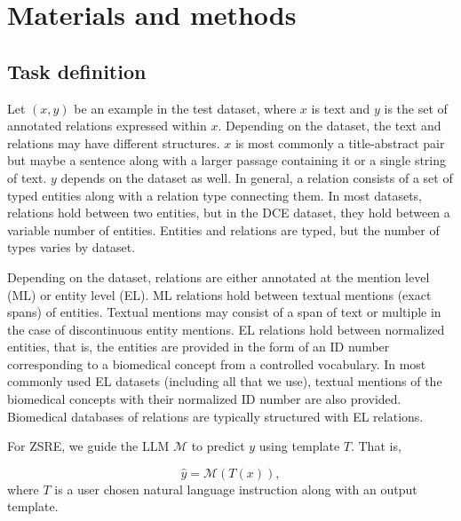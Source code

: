 \documentclass[11pt]{article}
\begin{document}
\section{Materials and methods}
\vspace{-1mm}
\subsection{Task definition}
Let $\left(x,y\right)$ be an example in the test dataset, where $x$ is text and $y$ is the set of annotated relations expressed within $x$. Depending on the dataset, the text and relations may have different structures. $x$ is most commonly a title-abstract pair but maybe a sentence along with a larger passage containing it or a single string of text. $y$ depends on the dataset as well. In general, a relation consists of a set of typed entities along with a relation type connecting them. In most datasets, relations hold between two entities, but in the DCE \cite{tiktinsky-etal-2022-dataset} dataset, they hold between a variable number of entities. Entities and relations are typed, but the number of types varies by dataset. 

Depending on the dataset, relations are either annotated at the mention level (ML) or entity level (EL). ML relations hold between textual mentions (exact spans) of entities. Textual mentions may consist of a span of text or multiple in the case of discontinuous entity mentions. EL relations hold between normalized entities, that is, the entities are provided in the form of an ID number corresponding to a biomedical concept from a controlled vocabulary. In most commonly used EL datasets (including all that we use), textual mentions of the biomedical concepts with their normalized ID number are also provided. Biomedical databases of relations are typically structured with EL relations. 

For ZSRE, we guide the LLM $\mathcal{M}$ to predict $y$ using template $T$. That is,

\begin{equation}
\widehat{y}=\mathcal{M}\left(T\left(x\right)\right),
\end{equation}
where $T$ is a user chosen natural language instruction along with an output template. 
\end{document}
